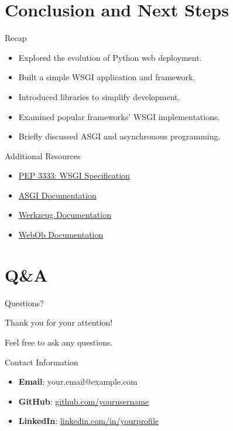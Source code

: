\documentclass{beamer}
\begin{document}
\section{Conclusion and Next Steps}

\begin{frame}{Recap}
    \begin{itemize}
        \item Explored the evolution of Python web deployment.
        \item Built a simple WSGI application and framework.
        \item Introduced libraries to simplify development.
        \item Examined popular frameworks' WSGI implementations.
        \item Briefly discussed ASGI and asynchronous programming.
    \end{itemize}
\end{frame}

\begin{frame}{Additional Resources}
    \begin{itemize}
        \item \href{https://www.python.org/dev/peps/pep-3333/}{PEP 3333: WSGI Specification}
        \item \href{https://asgi.readthedocs.io/en/latest/}{ASGI Documentation}
        \item \href{https://werkzeug.palletsprojects.com/}{Werkzeug Documentation}
        \item \href{https://docs.pylonsproject.org/projects/webob/en/stable/}{WebOb Documentation}
    \end{itemize}
\end{frame}

\section{Q\&A}

\begin{frame}{Questions?}
    \begin{center}
        \Large Thank you for your attention!
    \end{center}
    \begin{center}
        \normalsize Feel free to ask any questions.
    \end{center}
\end{frame}

\begin{frame}{Contact Information}
    \begin{itemize}
        \item \textbf{Email}: your.email@example.com
        \item \textbf{GitHub}: \href{https://github.com/yourusername}{github.com/yourusername}
        \item \textbf{LinkedIn}: \href{https://www.linkedin.com/in/yourprofile/}{linkedin.com/in/yourprofile}
    \end{itemize}
\end{frame}
\end{document}

